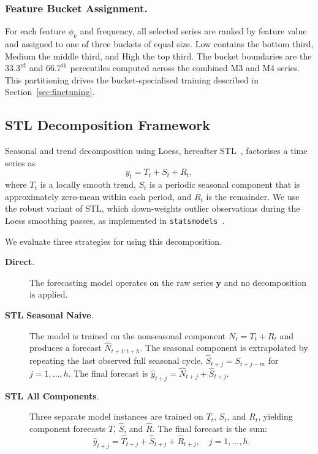 \documentclass[pdflatex,sn-mathphys-num]{sn-jnl}
\theoremstyle{thmstyleone}
\theoremstyle{thmstyletwo}
\theoremstyle{thmstylethree}
\begin{document}
\subsubsection{Feature Bucket Assignment.}\label{sec:buckets}

For each feature $\phi_k$ and frequency, all selected series are ranked by
feature value and assigned to one of three buckets of equal size. Low contains
the bottom third, Medium the middle third, and High the top third. The bucket
boundaries are the $33.3^{\text{rd}}$ and $66.7^{\text{th}}$ percentiles
computed across the combined M3 and M4 series. This partitioning drives the
bucket-specialised training described in Section~\ref{sec:finetuning}.

\subsection{STL Decomposition Framework}\label{sec:stl}

Seasonal and trend decomposition using Loess, hereafter
STL~\cite{cleveland1990stl}, factorises a time series as
\begin{equation}
  y_t = T_t + S_t + R_t,
  \label{eq:stl}
\end{equation}
where $T_t$ is a locally smooth trend, $S_t$ is a periodic seasonal component
that is approximately zero-mean within each period, and $R_t$ is the
remainder. We use the robust variant of STL, which down-weights outlier
observations during the Loess smoothing passes, as implemented in
\texttt{statsmodels}~\cite{seabold2010}.

We evaluate three strategies for using this decomposition.

\begin{description}
  \item[\textbf{Direct}.] The forecasting model operates on the raw series
    $\mathbf{y}$ and no decomposition is applied.

  \item[\textbf{STL Seasonal Naive}.] The model is trained on the nonseasonal
    component $N_t = T_t + R_t$ and produces a forecast $\hat{N}_{t+1:t+h}$.
    The seasonal component is extrapolated by repeating the last observed full
    seasonal cycle, $\hat{S}_{t+j} = S_{t+j-m}$ for $j = 1, \ldots, h$. The
    final forecast is $\hat{y}_{t+j} = \hat{N}_{t+j} + \hat{S}_{t+j}$.

  \item[\textbf{STL All Components}.] Three separate model instances are
    trained on $T_t$, $S_t$, and $R_t$, yielding component forecasts
    $\hat{T}$, $\hat{S}$, and $\hat{R}$. The final forecast is the sum:
    \begin{equation}
      \hat{y}_{t+j} = \hat{T}_{t+j} + \hat{S}_{t+j} + \hat{R}_{t+j},
      \quad j = 1, \ldots, h.
      \label{eq:recompose}
    \end{equation}
\end{description}
\end{document}

